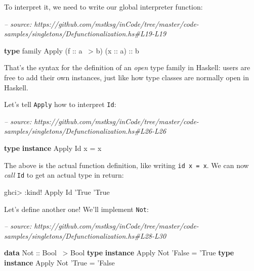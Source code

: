 \documentclass[]{article}
\newenvironment{Shaded}{}{}
\newcommand{\CommentTok}[1]{\textcolor[rgb]{0.38,0.63,0.69}{\textit{#1}}}
\newcommand{\DataTypeTok}[1]{\textcolor[rgb]{0.56,0.13,0.00}{#1}}
\newcommand{\FunctionTok}[1]{\textcolor[rgb]{0.02,0.16,0.49}{#1}}
\newcommand{\KeywordTok}[1]{\textcolor[rgb]{0.00,0.44,0.13}{\textbf{#1}}}
\newcommand{\NormalTok}[1]{#1}
\newcommand{\OtherTok}[1]{\textcolor[rgb]{0.00,0.44,0.13}{#1}}
\begin{document}
To interpret it, we need to write our global interpreter function:

\begin{Shaded}
\begin{Highlighting}[]
\CommentTok{-- source: https://github.com/mstksg/inCode/tree/master/code-samples/singletons/Defunctionalization.hs#L19-L19}

\KeywordTok{type}\NormalTok{ family }\DataTypeTok{Apply}\NormalTok{ (}\OtherTok{f ::}\NormalTok{ a }\FunctionTok{~>}\NormalTok{ b) (}\OtherTok{x ::}\NormalTok{ a)}\OtherTok{ ::}\NormalTok{ b}
\end{Highlighting}
\end{Shaded}

That's the syntax for the definition of an \emph{open} type family in Haskell:
users are free to add their own instances, just like how type classes are
normally open in Haskell.

Let's tell \texttt{Apply} how to interpret \texttt{Id}:

\begin{Shaded}
\begin{Highlighting}[]
\CommentTok{-- source: https://github.com/mstksg/inCode/tree/master/code-samples/singletons/Defunctionalization.hs#L26-L26}

\KeywordTok{type} \KeywordTok{instance} \DataTypeTok{Apply} \DataTypeTok{Id}\NormalTok{ x }\FunctionTok{=}\NormalTok{ x}
\end{Highlighting}
\end{Shaded}

The above is the actual function definition, like writing \texttt{id\ x\ =\ x}.
We can now \emph{call} \texttt{Id} to get an actual type in return:

\begin{Shaded}
\begin{Highlighting}[]
\NormalTok{ghci}\FunctionTok{>} \FunctionTok{:}\NormalTok{kind}\FunctionTok{!} \DataTypeTok{Apply} \DataTypeTok{Id}\NormalTok{ '}\DataTypeTok{True}
\NormalTok{'}\DataTypeTok{True}
\end{Highlighting}
\end{Shaded}

Let's define another one! We'll implement \texttt{Not}:

\begin{Shaded}
\begin{Highlighting}[]
\CommentTok{-- source: https://github.com/mstksg/inCode/tree/master/code-samples/singletons/Defunctionalization.hs#L28-L30}

\KeywordTok{data} \DataTypeTok{Not}\OtherTok{ ::} \DataTypeTok{Bool} \FunctionTok{~>} \DataTypeTok{Bool}
\KeywordTok{type} \KeywordTok{instance} \DataTypeTok{Apply} \DataTypeTok{Not}\NormalTok{ '}\DataTypeTok{False} \FunctionTok{=}\NormalTok{ '}\DataTypeTok{True}
\KeywordTok{type} \KeywordTok{instance} \DataTypeTok{Apply} \DataTypeTok{Not}\NormalTok{ '}\DataTypeTok{True}  \FunctionTok{=}\NormalTok{ '}\DataTypeTok{False}
\end{Highlighting}
\end{Shaded}
\end{document}
